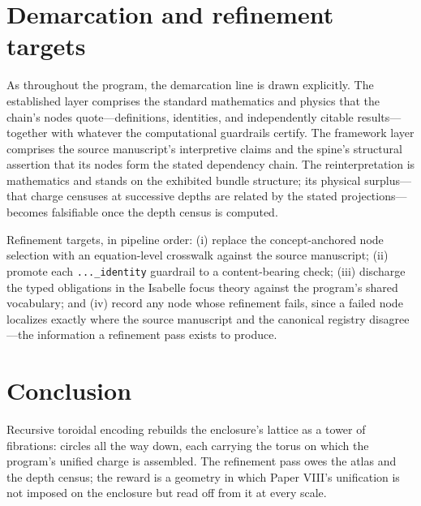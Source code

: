 \documentclass[11pt]{article}
\theoremstyle{remark}
\begin{document}
\section{Demarcation and refinement targets}
\label{sec:demarc}

As throughout the program, the demarcation line is drawn explicitly. The established layer comprises the standard mathematics and physics that the chain's nodes quote---definitions, identities, and independently citable results---together with whatever the computational guardrails certify. The framework layer comprises the source manuscript's interpretive claims and the spine's structural assertion that its nodes form the stated dependency chain. The reinterpretation is mathematics and stands on the exhibited bundle structure; its physical surplus---that charge censuses at successive depths are related by the stated projections---becomes falsifiable once the depth census is computed.

Refinement targets, in pipeline order: (i) replace the concept-anchored node selection with an equation-level crosswalk against the source manuscript; (ii) promote each \texttt{...\_identity} guardrail to a content-bearing check; (iii) discharge the typed obligations in the Isabelle focus theory against the program's shared vocabulary; and (iv) record any node whose refinement fails, since a failed node localizes exactly where the source manuscript and the canonical registry disagree---the information a refinement pass exists to produce.

\section{Conclusion}
\label{sec:conc}

Recursive toroidal encoding rebuilds the enclosure's lattice as a tower of fibrations: circles all the way down, each carrying the torus on which the program's unified charge is assembled. The refinement pass owes the atlas and the depth census; the reward is a geometry in which Paper VIII's unification is not imposed on the enclosure but read off from it at every scale.
\end{document}
